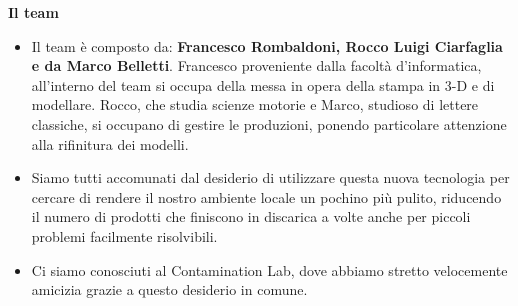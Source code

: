 \documentclass[hidelinks,aspectratio=169]{beamer}
\begin{document}
	\begin{frame}{\textbf{Il team}}
		\begin{itemize}
		
		\item Il team è composto da: \textbf{Francesco Rombaldoni, Rocco Luigi Ciarfaglia e da Marco Belletti}. \newline
		Francesco proveniente dalla facoltà d'informatica, all'interno del team si occupa della messa in opera della stampa in 3-D e di modellare. Rocco, che studia scienze motorie e Marco, studioso di lettere classiche, si occupano di gestire le produzioni, ponendo particolare attenzione alla rifinitura dei modelli. 
		\item Siamo tutti accomunati dal desiderio di utilizzare questa nuova tecnologia per cercare di rendere il nostro ambiente locale un pochino più pulito, riducendo il numero di prodotti che finiscono in discarica a volte anche per piccoli problemi facilmente risolvibili.
		\item Ci siamo conosciuti al Contamination Lab, dove abbiamo stretto velocemente amicizia grazie a questo desiderio in comune. 
			

\end{itemize}
\end{frame}
\end{document}
